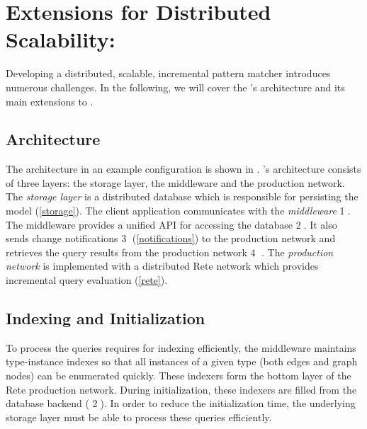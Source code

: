 

\section{Extensions for Distributed Scalability: \iqd{}}
\label{iqd-architecture}

Developing a distributed, scalable, incremental pattern matcher introduces numerous challenges. In the following, we will cover the \iqd{}'s architecture and its main extensions to \eiq{}.


\subsection{Architecture}

The \iqd{} architecture in an example configuration is shown in . \iqd{}'s architecture consists of three layers: the storage layer, the middleware and the production network. 
The \emph{storage layer} is a distributed database which is responsible for persisting the model (\autoref{storage}). 
The client application communicates with the \emph{middleware} \textcircled{1}. The middleware provides a unified API for accessing the database \textcircled{2}. It also sends change notifications \textcircled{3} (\autoref{notifications}) to the production network and retrieves the query results from the production network \textcircled{4} . 
The \emph{production network} is implemented with a distributed Rete network which provides incremental query evaluation (\autoref{rete}).

\subsection{Indexing and Initialization}
\label{indexing}

To process the queries requires for indexing efficiently, the \iqd{} middleware maintains type-instance indexes so that all instances of a given type (both edges and graph nodes) can be enumerated quickly. These indexers form the bottom layer of the Rete production network. During initialization, these indexers are filled from the database backend ( \textcircled{2}). In order to reduce the initialization time, the underlying storage layer must be able to process these queries efficiently. 

